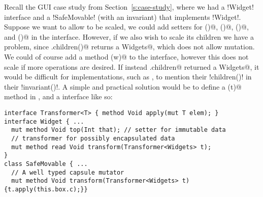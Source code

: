 Recall the GUI case study from Section~\ref{s:case-study}, where we had a \Q!Widget! interface and a \Q!SafeMovable! (with an invariant) that implements \Q!Widget!.
Suppose we want to allow \Q@Widget@s to be scaled, we could add \Q@mut@ setters for \Q@width()@, \Q@height()@, \Q@left()@, and \Q@top()@ in the \Q@Widget@ interface. However, if we also wish to scale its children we have a problem, since \Q@Widget.children()@ returns a \Q@read Widgets@, which does not allow mutation. We could of course add a \Q@mut@ method \Q@zoom(w)@ to the \Q@Widget@ interface, however this does not scale if more operations are desired. If instead \Q@Widget.children@ returned a \Q@mut Widgets@, it would be difficult for \Q@Widget@ implementations, such as \Q@SafeMovable@, 
to mention their \Q!children()! in their \Q!invariant()!.
A simple and practical solution would be to define a \Q@transform(t)@ method in \Q@Widget@, and a \Q@Transformer@ interface 
like so:
\begin{lstlisting}[escapechar=\%]
interface Transformer<T> { method Void apply(mut T elem); }
interface Widget { ...
  mut method Void top(Int that); // setter for immutable data
  // transformer for possibly encapsulated data
  mut method read Void transform(Transformer<Widgets> t);
}
class SafeMovable { ...
  // A well typed capsule mutator
  mut method Void transform(Transformer<Widgets> t) {t.apply(this.box.c);}}
\end{lstlisting}
